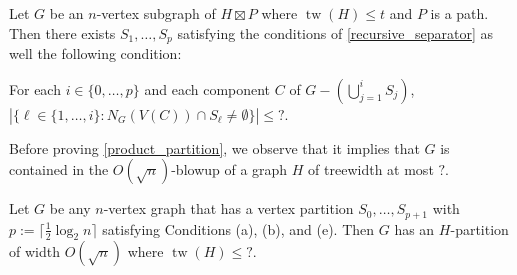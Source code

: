 \documentclass{patmorin}
\renewcommand{\le}{\leqslant}
\DeclareMathOperator{\tw}{tw}
\begin{document}
\begin{lem}\label{product_partition}
  Let $G$ be an $n$-vertex subgraph of $H\boxtimes P$ where $\tw(H)\le t$ and $P$ is a path.  Then there exists $S_1,\ldots,S_p$ satisfying the conditions of \cref{recursive_separator} as well the following condition:
  \begin{compactenum}[(a)]\setcounter{enumi}{4}
    \item For each $i\in\{0,\ldots,p\}$ and each component $C$ of $G-(\bigcup_{j=1}^i S_j)$, $|\{\ell\in\{1,\ldots,i\}:N_G(V(C))\cap S_\ell\neq\emptyset\}|\le {?}$.
  \end{compactenum}
\end{lem}

Before proving \cref{product_partition}, we observe that it implies that $G$ is contained in the $O(\sqrt{n})$-blowup of a graph $H$ of treewidth at most $?$.

\begin{thm}
  Let $G$ be any $n$-vertex graph that has a vertex partition $S_0,\ldots,S_{p+1}$ with $p:=\lceil\tfrac{1}{2}\log_2 n\rceil$ satisfying Conditions (a), (b), and (e).  Then $G$ has an $H$-partition of width $O(\sqrt{n})$ where $\tw(H)\le {?}$.
\end{thm}
\end{document}
